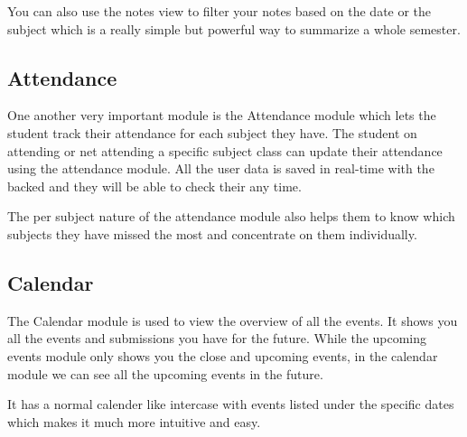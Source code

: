 You can also use the notes view to filter your notes based on the date or the subject which is a really simple but powerful way to summarize a whole semester.

\subsection{Attendance}
One another very important module is the Attendance module which lets the student track their attendance for each subject they have. The student on attending or net attending a specific subject class can update their attendance using the attendance module. All the user data is saved in real-time with the backed and they will be able to check their any time.

The per subject nature of the attendance module also helps them to know which subjects they have missed the most and concentrate on them individually.

\subsection{Calendar}
The Calendar module is used to view the overview of all the events. It shows you all the events and submissions you have for the future. While the upcoming events module only shows you the close and upcoming events, in the calendar module we can see all the upcoming events in the future.

It has a normal calender like intercase with events listed under the specific dates which makes it much more intuitive and easy.
